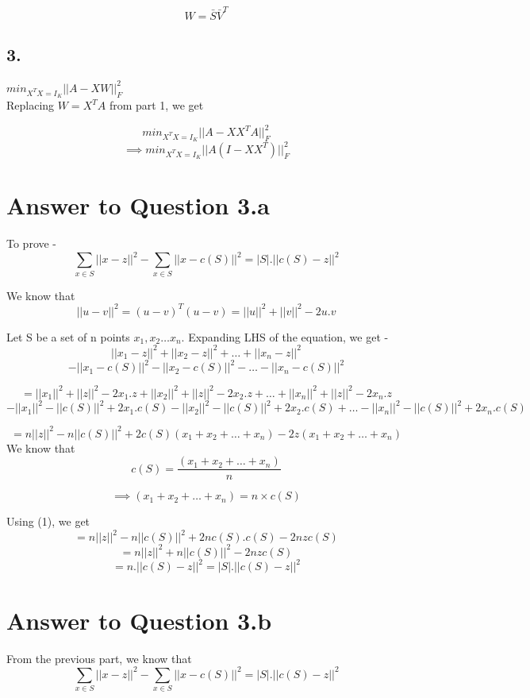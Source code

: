\documentclass[11pt]{article}
\begin{document}
{$$W = \bar{S}\bar{V}^T$$

\subsection*{3.}
$min_{X^TX = I_K} ||A-XW||_F^2$\\

Replacing $W = X^T A$ from part 1, we get

$$min_{X^TX = I_K} ||A-XX^T A||_F^2$$
$$ \implies min_{X^TX = I_K} ||A (I-XX^T)||_F^2$$

\pagebreak[4]
\section*{Answer to Question 3.a}
To prove -
$$\sum_{x \in S} || x - z ||^2 - \sum_{x \in S} || x - c(S)||^2 = |S| . || c(S) - z ||^2$$

We know that 
$$||u - v||^2 = (u - v)^T (u - v) = ||u||^2 + ||v||^2 - 2u.v$$

Let S be a set of n points $x_1, x_2 \hdots x_n$. Expanding LHS of the equation, we get -
$$ || x_1 - z ||^2 + || x_2 - z ||^2 + \hdots + || x_n - z ||^2$$ 
$$- || x_1 - c(S)||^2 - || x_2 - c(S)||^2 - \hdots - || x_n - c(S)||^2$$

$$ = ||x_1||^2 + ||z||^2 - 2x_1.z + ||x_2||^2 + ||z||^2 - 2x_2.z + \hdots + ||x_n||^2 + ||z||^2 - 2x_n.z$$
$$ - ||x_1||^2 - ||c(S)||^2 + 2x_1.c(S) - ||x_2||^2 - ||c(S)||^2 + 2x_2.c(S) + \hdots - ||x_n||^2 - ||c(S)||^2 + 2x_n.c(S)$$

$$ = n ||z||^2 - n ||c(S)||^2 + 2 c(S) (x_1 + x_2 + \hdots + x_n) - 2 z (x_1 + x_2 + \hdots + x_n)$$
We know that
$$c(S) = \frac{(x_1 + x_2 + \hdots + x_n)}{n}$$

\setcounter{equation}{0}
\begin{equation}
\implies  (x_1 + x_2 + \hdots + x_n) = n \times c(S)
\end{equation} 

Using (1), we get
$$ = n ||z||^2 - n ||c(S)||^2 + 2 n c(S).c(S)  - 2 n z c(S)$$
$$ = n ||z||^2 + n ||c(S)||^2 - 2 n z c(S)$$
$$ =  n . || c(S) - z ||^2 = |S| . || c(S) - z ||^2$$


\pagebreak[4]
\section*{Answer to Question 3.b}
From the previous part, we know that $$\sum_{x \in S} || x - z ||^2 - \sum_{x \in S} || x - c(S)||^2 = |S| . || c(S) - z ||^2$$

}
\end{document}
